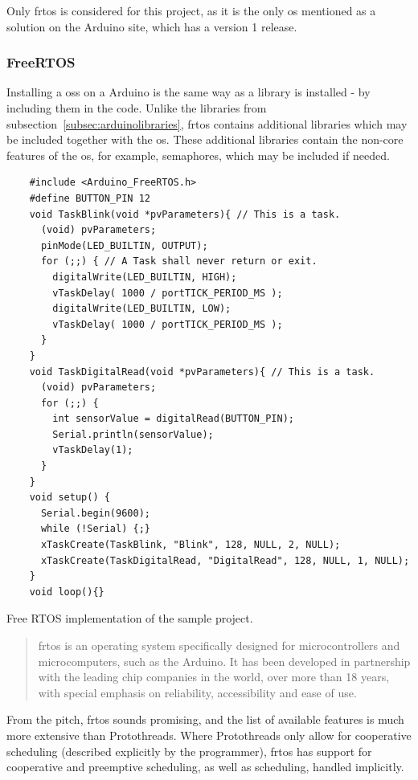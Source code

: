 Only \gls{frtos} is considered for this project, as it is the only \gls{os} mentioned as a solution on the Arduino site, which has a version 1 release.


\subsubsection{FreeRTOS}
Installing a \glspl{os} on a Arduino is the same way as a library is installed - by including them in the code. Unlike the libraries from subsection~\ref{subsec:arduinolibraries}, \gls{frtos} contains additional libraries which may be included together with the \gls{os}. These additional libraries contain the non-core features of the \gls{os}, for example, semaphores, which may be included if needed.


\begin{listing}[htb!]
  \centering
  \begin{verbatim}
    #include <Arduino_FreeRTOS.h>
    #define BUTTON_PIN 12
    void TaskBlink(void *pvParameters){ // This is a task.
      (void) pvParameters;
      pinMode(LED_BUILTIN, OUTPUT);
      for (;;) { // A Task shall never return or exit.
        digitalWrite(LED_BUILTIN, HIGH);
        vTaskDelay( 1000 / portTICK_PERIOD_MS );
        digitalWrite(LED_BUILTIN, LOW);
        vTaskDelay( 1000 / portTICK_PERIOD_MS );
      }
    }
    void TaskDigitalRead(void *pvParameters){ // This is a task.
      (void) pvParameters;
      for (;;) {
        int sensorValue = digitalRead(BUTTON_PIN);
        Serial.println(sensorValue);
        vTaskDelay(1);
      }
    }
    void setup() {
      Serial.begin(9600);
      while (!Serial) {;}
      xTaskCreate(TaskBlink, "Blink", 128, NULL, 2, NULL);
      xTaskCreate(TaskDigitalRead, "DigitalRead", 128, NULL, 1, NULL);
    }
    void loop(){}
\end{verbatim}
  \caption{Free RTOS implementation of the sample project.}
  \label{lst:freeftosexample}
\end{listing}


\blockcquote{AboutRTOS}{\gls{frtos} is an operating system specifically designed for microcontrollers and microcomputers, such as the Arduino. It has been developed in partnership with the leading chip companies in the world, over more than 18 years, with special emphasis on reliability, accessibility and ease of use.}

From the pitch, \gls{frtos} sounds promising, and the list of available features is much more extensive than Protothreads. Where Protothreads only allow for cooperative scheduling (described explicitly by the programmer), \gls{frtos} has support for cooperative and preemptive scheduling, as well as scheduling, handled implicitly.

